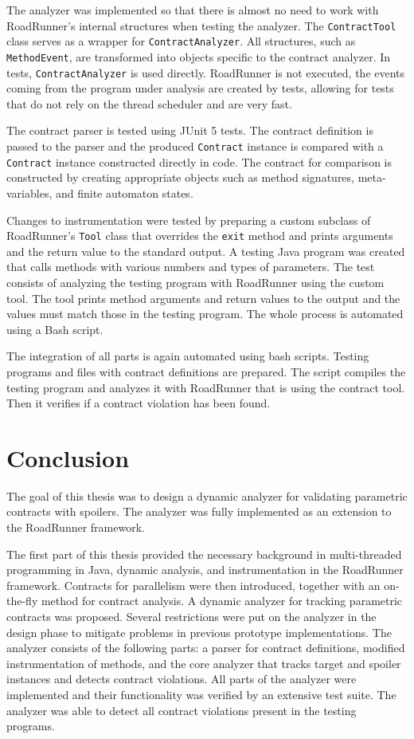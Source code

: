 The analyzer was implemented so that there is almost no need to work with
RoadRunner's internal structures when testing the analyzer. The
\texttt{ContractTool} class serves as a wrapper for \texttt{ContractAnalyzer}.
All structures, such as \texttt{MethodEvent}, are transformed into objects
specific to the contract analyzer. In tests, \texttt{ContractAnalyzer} is used
directly. RoadRunner is not executed, the events coming from the program under
analysis are created by tests, allowing for tests that do not rely on the
thread scheduler and are very fast.

The contract parser is tested using JUnit 5 tests. The contract definition is
passed to the parser and the produced \texttt{Contract} instance is compared
with a \texttt{Contract} instance constructed directly in code. The contract for
comparison is constructed by creating appropriate objects such as method
signatures, meta-variables, and finite automaton states.

Changes to instrumentation were tested by preparing a custom subclass of
RoadRunner's \texttt{Tool} class that overrides the \texttt{exit} method and
prints arguments and the return value to the standard output. A testing Java
program was created that calls methods with various numbers and types of
parameters. The test consists of analyzing the testing program with RoadRunner
using the custom tool. The tool prints method arguments and return values to the
output and the values must match those in the testing program. The whole process
is automated using a Bash script.

The integration of all parts is again automated using bash scripts. Testing
programs and files with contract definitions are prepared. The script compiles
the testing program and analyzes it with RoadRunner that is using the contract
tool. Then it verifies if a contract violation has been found.



\chapter{Conclusion}

The goal of this thesis was to design a dynamic analyzer for validating
parametric contracts with spoilers. The analyzer was fully implemented as an
extension to the RoadRunner framework.

The first part of this thesis provided the necessary background in
multi-threaded programming in Java, dynamic analysis, and instrumentation in the
RoadRunner framework. Contracts for parallelism were then introduced, together
with an on-the-fly method for contract analysis. A dynamic analyzer for tracking
parametric contracts was proposed. Several restrictions were put on the analyzer
in the design phase to mitigate problems in previous prototype implementations.
The analyzer consists of the following parts: a parser for contract definitions,
modified instrumentation of methods, and the core analyzer that tracks target
and spoiler instances and detects contract violations. All parts of the analyzer
were implemented and their functionality was verified by an extensive test
suite. The analyzer was able to detect all contract violations present in the
testing programs.

